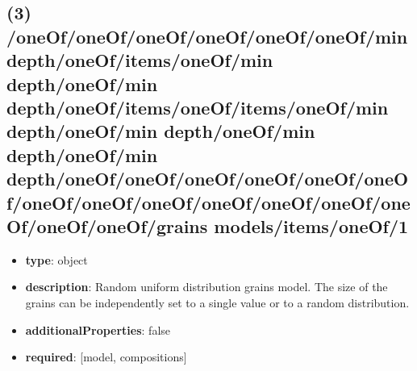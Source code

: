 \subsection{(3) /oneOf/oneOf/oneOf/oneOf/oneOf/oneOf/min depth/oneOf/items/oneOf/min depth/oneOf/min depth/oneOf/items/oneOf/items/oneOf/min depth/oneOf/min depth/oneOf/min depth/oneOf/min depth/oneOf/oneOf/oneOf/oneOf/oneOf/oneOf/oneOf/oneOf/oneOf/oneOf/oneOf/oneOf/oneOf/oneOf/oneOf/grains models/items/oneOf/1}
\begin{itemize}[leftmargin=3em]\item {\bf type}: object
\item {\bf description}: Random uniform distribution grains model. The size of the grains can be independently set to a single value or to a random distribution.
\item {\bf additionalProperties}: false
\item {\bf required}: [model, compositions]\end{itemize}
